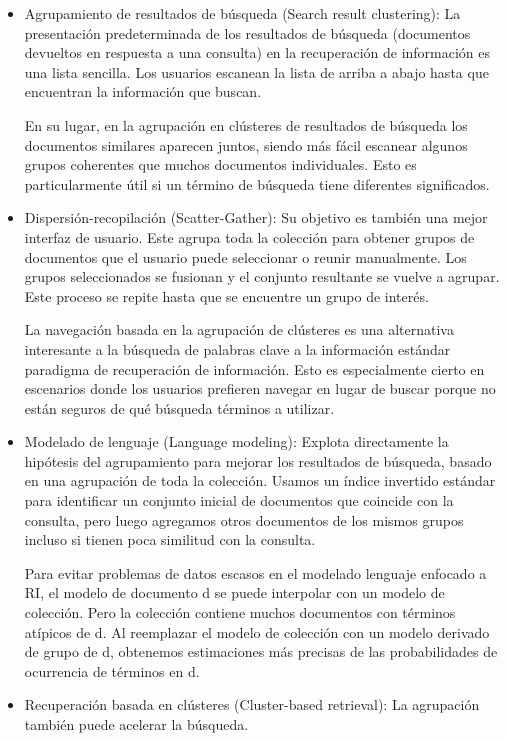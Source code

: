 \documentclass{llncs}
\begin{document}
\begin{itemize}
	\item Agrupamiento de resultados de búsqueda (Search result clustering): La presentación predeterminada de los resultados de búsqueda (documentos devueltos en respuesta a una consulta) en la recuperación de información es una lista sencilla. Los usuarios escanean la lista de arriba a abajo hasta que encuentran la información que buscan. 
	
	En su lugar, en la agrupación en clústeres de resultados de búsqueda los documentos similares aparecen juntos, siendo más fácil escanear algunos grupos coherentes que muchos documentos individuales. Esto es particularmente útil si un término de búsqueda tiene diferentes significados.
	
	\item Dispersión-recopilación (Scatter-Gather): Su objetivo es tambi\'en una mejor interfaz de usuario. Este agrupa toda la colección para obtener grupos de documentos que el usuario puede seleccionar o reunir manualmente. Los grupos seleccionados se fusionan y el conjunto resultante se vuelve a agrupar. Este proceso se repite hasta que se encuentre un grupo de interés.
	
	La navegación basada en la agrupaci\'on de clústeres es una alternativa interesante a la búsqueda de palabras clave a la información estándar paradigma de recuperación de información. Esto es especialmente cierto en escenarios donde los usuarios prefieren navegar en lugar de buscar porque no están seguros de qué búsqueda términos a utilizar.
	
	\item Modelado de lenguaje (Language modeling): Explota directamente la hipótesis del agrupamiento para mejorar los resultados de búsqueda, basado en una agrupación de toda la colección. Usamos un índice invertido estándar para identificar un conjunto inicial de documentos que coincide con la consulta, pero luego agregamos otros documentos de los mismos grupos incluso si tienen poca similitud con la consulta. 
	
 	Para evitar problemas de datos escasos en el modelado lenguaje enfocado a RI, el modelo de documento d se puede interpolar con un modelo de colección. Pero la colección contiene muchos documentos con términos atípicos de d. Al reemplazar el modelo de colección con un modelo derivado de grupo de d, obtenemos estimaciones más precisas de las probabilidades de ocurrencia de términos en d.
	
	\item Recuperaci\'on basada en cl\'usteres (Cluster-based retrieval): La agrupación también puede acelerar la búsqueda. 
	

\end{itemize}
\end{document}
